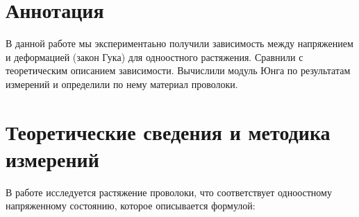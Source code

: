 \section{Аннотация}


    В данной работе мы экспериментаьно получили зависимость между напряжением и деформацией (закон Гука) для одноостного растяжения. Сравнили с теоретическим описанием зависимости. Вычислили модуль Юнга по результатам измерений и определили по нему материал проволоки.
    
    
    
    
\section{Теоретические сведения и методика измерений}

    В работе исследуется растяжение проволоки, что соответствует одноостному напряженному состоянию, которое описывается формулой:
    

